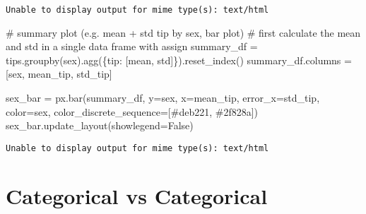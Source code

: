 \documentclass[
  letterpaper,
  DIV=11,
  numbers=noendperiod]{scrreprt}
\newenvironment{Shaded}{\begin{snugshade}}{\end{snugshade}}
\newcommand{\CommentTok}[1]{\textcolor[rgb]{0.37,0.37,0.37}{#1}}
\newcommand{\NormalTok}[1]{\textcolor[rgb]{0.00,0.23,0.31}{#1}}
\newcommand{\OperatorTok}[1]{\textcolor[rgb]{0.37,0.37,0.37}{#1}}
\newcommand{\StringTok}[1]{\textcolor[rgb]{0.13,0.47,0.30}{#1}}
\newcommand{\VariableTok}[1]{\textcolor[rgb]{0.07,0.07,0.07}{#1}}
\begin{document}
\begin{verbatim}
Unable to display output for mime type(s): text/html
\end{verbatim}

\begin{Shaded}
\begin{Highlighting}[]
\CommentTok{\# summary plot (e.g. mean + std tip by sex, bar plot)}
\CommentTok{\# first calculate the mean and std in a single data frame with assign }
\NormalTok{summary\_df }\OperatorTok{=}\NormalTok{ tips.groupby(}\StringTok{\textquotesingle{}sex\textquotesingle{}}\NormalTok{).agg(\{}\StringTok{\textquotesingle{}tip\textquotesingle{}}\NormalTok{: [}\StringTok{\textquotesingle{}mean\textquotesingle{}}\NormalTok{, }\StringTok{\textquotesingle{}std\textquotesingle{}}\NormalTok{]\}).reset\_index()}
\NormalTok{summary\_df.columns }\OperatorTok{=}\NormalTok{ [}\StringTok{\textquotesingle{}sex\textquotesingle{}}\NormalTok{, }\StringTok{\textquotesingle{}mean\_tip\textquotesingle{}}\NormalTok{, }\StringTok{\textquotesingle{}std\_tip\textquotesingle{}}\NormalTok{]}

\NormalTok{sex\_bar }\OperatorTok{=}\NormalTok{   px.bar(summary\_df, y}\OperatorTok{=}\StringTok{\textquotesingle{}sex\textquotesingle{}}\NormalTok{, x}\OperatorTok{=}\StringTok{\textquotesingle{}mean\_tip\textquotesingle{}}\NormalTok{, error\_x}\OperatorTok{=}\StringTok{\textquotesingle{}std\_tip\textquotesingle{}}\NormalTok{, color}\OperatorTok{=}\StringTok{\textquotesingle{}sex\textquotesingle{}}\NormalTok{, color\_discrete\_sequence}\OperatorTok{=}\NormalTok{[}\StringTok{\textquotesingle{}\#deb221\textquotesingle{}}\NormalTok{, }\StringTok{\textquotesingle{}\#2f828a\textquotesingle{}}\NormalTok{])}
\NormalTok{sex\_bar.update\_layout(showlegend}\OperatorTok{=}\VariableTok{False}\NormalTok{)}
\end{Highlighting}
\end{Shaded}

\begin{verbatim}
Unable to display output for mime type(s): text/html
\end{verbatim}

\chapter{Categorical vs Categorical}\label{categorical-vs-categorical}
\end{document}
